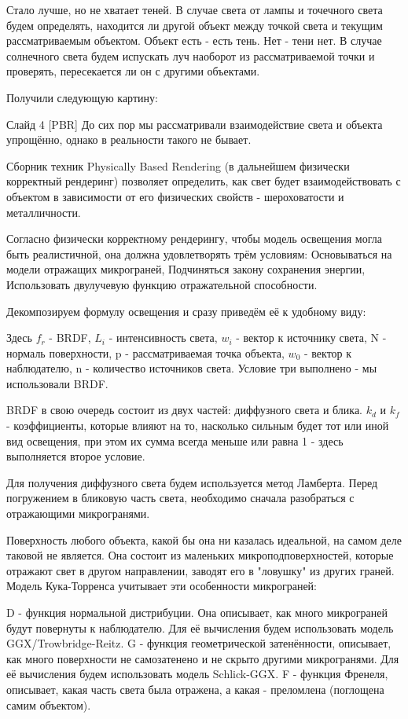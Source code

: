 \documentclass[a4paper,14pt]{extarticle}
\begin{document}
Стало лучше, но не хватает теней. В случае света от лампы и точечного света будем определять, находится ли 
другой объект между точкой света и текущим рассматриваемым объектом. Объект есть - есть тень. Нет - тени нет.
В случае солнечного света будем испускать луч наоборот из рассматриваемой точки и проверять, пересекается ли он с 
другими объектами.

Получили следующую картину:

Слайд 4 [PBR]
До сих пор мы рассматривали взаимодействие света и 
объекта упрощённо, однако в реальности такого не бывает.

Сборник техник Physically Based Rendering (в дальнейшем физически корректный рендеринг) 
позволяет определить, как свет будет взаимодействовать с объектом в зависимости 
от его физических свойств - шероховатости и металличности.

Согласно физически корректному рендерингу, чтобы модель освещения могла быть реалистичной,
она должна удовлетворять трём условиям: Основываться на модели отражащих микрограней, Подчиняться закону сохранения энергии, Использовать двулучевую функцию отражательной способности. 

Декомпозируем формулу освещения и сразу приведём её к удобному виду:

Здесь $f_r$ - BRDF, 
$L_i$ - интенсивность света, $w_i$ - вектор к источнику света, N - нормаль поверхности, p - рассматриваемая точка объекта, $w_0$ - вектор к наблюдателю, n - количество источников света.
Условие три выполнено - мы использовали BRDF.

BRDF в свою очередь состоит из двух частей: диффузного света и блика.
$k_d$ и $k_f$ - коэффициенты, которые влияют на то, насколько сильным будет тот или иной вид освещения, при этом их сумма 
всегда меньше или равна 1 - здесь выполняется второе условие.

Для получения диффузного света будем используется метод Ламберта.
Перед погружением в бликовую часть света, необходимо сначала разобраться с отражающими микрогранями.

Поверхность любого объекта, какой бы она ни казалась идеальной, на самом деле таковой не является. 
Она состоит из маленьких микроподповерхностей, которые отражают свет в другом направлении, заводят его
в "ловушку" из других граней. Модель Кука-Торренса учитывает эти особенности микрограней:  

D - функция нормальной дистрибуции. Она описывает, как много микрограней будут повернуты к наблюдателю. Для её вычисления будем использовать модель GGX/Trowbridge-Reitz.
G - функция геометрической затенённости, описывает, как много поверхности не самозатенено и не скрыто другими микрогранями. Для её вычисления будем использовать модель Schlick-GGX.
F - функция Френеля, описывает, какая часть света была отражена, а какая - преломлена (поглощена самим объектом). 
\end{document}
